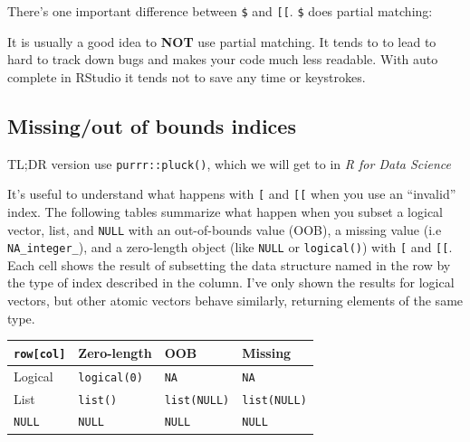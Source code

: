 \documentclass[]{book}
\newenvironment{Shaded}{\begin{snugshade}}{\end{snugshade}}
\newcommand{\KeywordTok}[1]{\textcolor[rgb]{0.13,0.29,0.53}{\textbf{#1}}}
\newcommand{\DataTypeTok}[1]{\textcolor[rgb]{0.13,0.29,0.53}{#1}}
\newcommand{\DecValTok}[1]{\textcolor[rgb]{0.00,0.00,0.81}{#1}}
\newcommand{\StringTok}[1]{\textcolor[rgb]{0.31,0.60,0.02}{#1}}
\newcommand{\CommentTok}[1]{\textcolor[rgb]{0.56,0.35,0.01}{\textit{#1}}}
\newcommand{\OperatorTok}[1]{\textcolor[rgb]{0.81,0.36,0.00}{\textbf{#1}}}
\newcommand{\NormalTok}[1]{#1}
\theoremstyle{definition}
\theoremstyle{definition}
\theoremstyle{definition}
\theoremstyle{remark}
\begin{document}
There's one important difference between \texttt{\$} and
\texttt{{[}{[}}. \texttt{\$} does partial matching:

\begin{Shaded}
\end{Shaded}

It is usually a good idea to \textbf{NOT} use partial matching. It tends
to to lead to hard to track down bugs and makes your code much less
readable. With auto complete in RStudio it tends not to save any time or
keystrokes.

\subsection{Missing/out of bounds
indices}\label{missingout-of-bounds-indices}

TL;DR version use \texttt{purrr::pluck()}, which we will get to in
\emph{R for Data Science}

It's useful to understand what happens with \texttt{{[}} and
\texttt{{[}{[}} when you use an ``invalid'' index. The following tables
summarize what happen when you subset a logical vector, list, and
\texttt{NULL} with an out-of-bounds value (OOB), a missing value (i.e
\texttt{NA\_integer\_}), and a zero-length object (like \texttt{NULL} or
\texttt{logical()}) with \texttt{{[}} and \texttt{{[}{[}}. Each cell
shows the result of subsetting the data structure named in the row by
the type of index described in the column. I've only shown the results
for logical vectors, but other atomic vectors behave similarly,
returning elements of the same type.

\begin{longtable}[]{@{}llll@{}}
\toprule
\texttt{row{[}col{]}} & Zero-length & OOB & Missing\tabularnewline
\midrule
\endhead
Logical & \texttt{logical(0)} & \texttt{NA} & \texttt{NA}\tabularnewline
List & \texttt{list()} & \texttt{list(NULL)} &
\texttt{list(NULL)}\tabularnewline
\texttt{NULL} & \texttt{NULL} & \texttt{NULL} &
\texttt{NULL}\tabularnewline
\bottomrule
\end{longtable}
\end{document}
